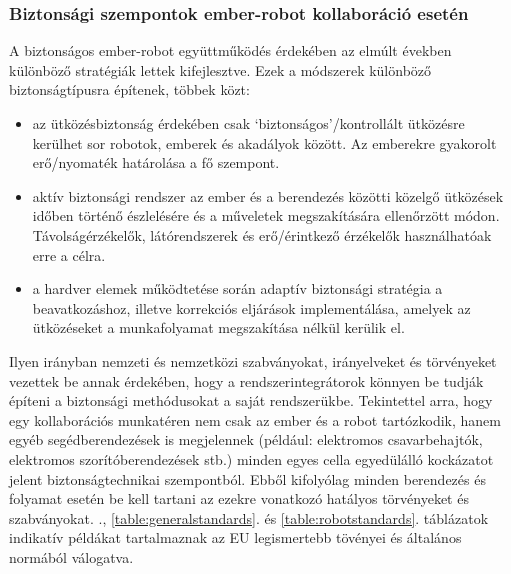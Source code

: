 \documentclass[../documentation.tex]{subfiles}
\begin{document}
\subsubsection{Biztonsági szempontok ember-robot kollaboráció esetén} \label{safetypoints}
A biztonságos ember-robot együttműködés érdekében az elmúlt években különböző stratégiák lettek kifejlesztve. Ezek a módszerek különböző biztonságtípusra építenek, többek közt\cite{safehrc}:
\begin{itemize}
	\item az ütközésbiztonság érdekében csak `biztonságos'/kontrollált ütközésre kerülhet sor robotok, emberek és akadályok között. Az emberekre gyakorolt erő/nyomaték határolása a fő szempont.
	\item aktív biztonsági rendszer az ember és a berendezés közötti közelgő ütközések időben történő észlelésére és a műveletek megszakítására ellenőrzött módon. Távolságérzékelők, látórendszerek és erő/érintkező érzékelők használhatóak erre a célra.
	\item a hardver elemek működtetése során adaptív biztonsági stratégia a beavatkozáshoz, illetve korrekciós eljárások implementálása, amelyek az ütközéseket a munkafolyamat megszakítása nélkül kerülik el.
\end{itemize}
Ilyen irányban nemzeti és nemzetközi szabványokat, irányelveket és törvényeket vezettek be annak érdekében, hogy a rendszerintegrátorok könnyen be tudják építeni a biztonsági methódusokat a saját rendszerükbe. Tekintettel arra, hogy egy kollaborációs munkatéren nem csak az ember és a robot tartózkodik, hanem egyéb segédberendezések is megjelennek (például: elektromos csavarbehajtók, elektromos szorítóberendezések stb.) minden egyes cella egyedülálló kockázatot jelent biztonságtechnikai szempontból. Ebből kifolyólag minden berendezés és folyamat esetén be kell tartani az ezekre vonatkozó hatályos törvényeket és szabványokat. ., \ref{table:generalstandards}. és \ref{table:robotstandards}. táblázatok indikatív példákat tartalmaznak az EU legismertebb tövényei és általános normából válogatva.
\end{document}
